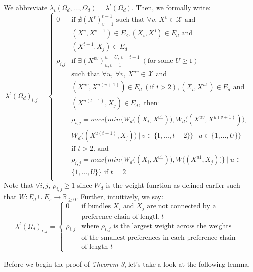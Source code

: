 \documentclass{article} %
\begin{document}
We abbreviate $\lambda_t(\Omega_d,\ldots,\Omega_d)=\lambda^t(\Omega_d)$. Then, we formally write:
\[
  \lambda^t(\Omega_d)_{i,j}=
  \begin{cases}
  0 & \textrm{if } \nexists (X^v)_{v=1}^{t-1} \textrm{ such that } \forall v,\ X^v\in\mathcal{X}\textrm{ and } \\
  & (X^v,X^{v+1})\in E_d, (X_i,X^1)\in E_d \textrm{ and } \\
  & (X^{t-1},X_j)\in E_d\\ 
  \rho_{i,j} & \textrm{if }\exists (X^{uv})_{u,v=1}^{u=U,\ v=t-1}\ (\textrm{for some }U\geq1) \\
  & \textrm{such that }\forall u,\ \forall v,\ X^{uv}\in\mathcal{X} \textrm{ and } \\
  & (X^{uv},X^{u(v+1)})\in E_d\ (\textrm{if }t>2), (X_i, X^{u1})\in E_d \textrm{ and } \\
  & (X^{u(t-1)},X_j)\in E_d, \textrm{ then: } \\
  & \rho_{i,j}=max\Big\{min\big\{W_d\big((X_i,X^{u1})\big),W_d\big((X^{uv},X^{u(v+1)})\big), \\
  & W_d\big((X^{u(t-1)},X_j)\big)\ |\ v\in\{1,\ldots,t-2\}\big\}\ |\ u\in\{1,\ldots,U\}\Big\} \\
  &\textrm{if } t>2,\ \textrm{and }\\
  &\rho_{i,j}=max\Big\{min\big\{W_d\big((X_i,X^{u1})\big), W\big((X^{u1},X_j)\big)\big\}\ |\ u\in\\
  &\{1,\ldots,U\}\Big\} \textrm{ if } t=2\\
  \end{cases}
\]
Note that $\forall i,j$, $\rho_{i,j}\geq1$ since $W_d$ is the weight function as defined earlier such that $W:E_d \cup E_s\to\mathbb{R}_{\geq0}$. Further, intuitively, we say:
\[
  \lambda^t(\Omega_d)_{i,j}=
  \begin{cases}
  0 & \textrm{if bundles }X_i \textrm{ and }X_j\textrm{ are not connected by a} \\
  & \textrm{preference chain of length } t\\
  \rho_{i,j} & \textrm{where }\rho_{i,j}\textrm{ is the largest weight across the weights} \\
  & \textrm{of the smallest preferences in each preference chain }\\
  & \textrm{of length }t
  \end{cases}
\]

Before we begin the proof of \textit{Theorem 3}, let's take a look at the following lemma.
\end{document}
